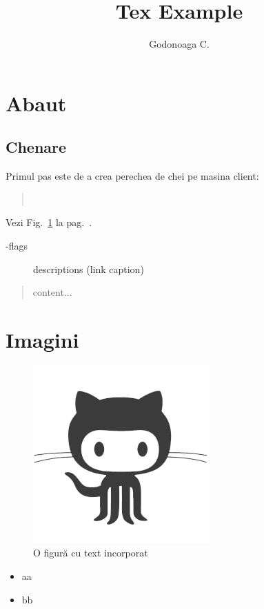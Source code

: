\documentclass[]{article}
\title{Tex Example}
\author{Godonoaga C.}
\begin{document}
\maketitle

\begin{abstract}

\end{abstract}

\section{Abaut}

\subsection{Chenare}
Primul pas este de a crea perechea de chei pe masina client:

\begin{quote}\tt
\end{quote}

Vezi Fig.~\ref{fig:name_picture_fig}
la pag.~\pageref{fig:name_picture_fig}.


\begin{description}
	\item[-flags] descriptions \hfill (link caption)
\end{description}





\begin{quote}
	\raggedleft content...
\end{quote}

\newpage
\section{Imagini}

\begin{figure}[htb]
	\begin{center}
		\includegraphics[scale = 1]{img/1.png}
		\caption{O figur\u{a} cu text incorporat}%
		\label{fig:name_picture_fig}
	\end{center}
\end{figure}

\begin{itemize}
	\label{key_name}
	\item aa
	\item bb
\end{itemize}
\end{document}
